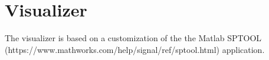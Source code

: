 
\chapter{Visualizer}

The visualizer is based on a customization of the the Matlab SPTOOL (https://www.mathworks.com/help/signal/ref/sptool.html) application.
